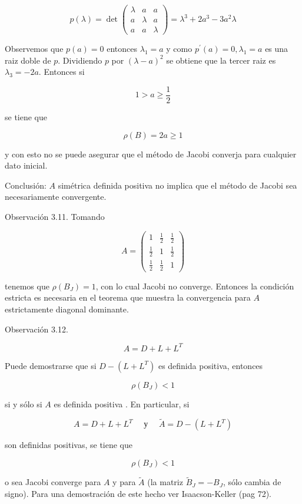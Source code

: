 \documentclass[10pt]{book}
\begin{document}
$$
p(\lambda)=\operatorname{det}\left(\begin{array}{ccc}
\lambda & a & a \\
a & \lambda & a \\
a & a & \lambda
\end{array}\right)=\lambda^{3}+2 a^{3}-3 a^{2} \lambda
$$

Observemos que $p(a)=0$ entonces $\lambda_{1}=a$ y como $p^{\prime}(a)=0, \lambda_{1}=a$ es una raiz doble de $p$. Dividiendo $p$ por $(\lambda-a)^{2}$ se obtiene que la tercer raiz es $\lambda_{3}=-2 a$. Entonces si

$$
1>a \geq \frac{1}{2}
$$

se tiene que

$$
\rho(B)=2 a \geq 1
$$

y con esto no se puede asegurar que el método de Jacobi converja para cualquier dato inicial.

Conclusión: $A$ simétrica definida positiva no implica que el método de Jacobi sea necesariamente convergente.

Observación 3.11. Tomando

$$
A=\left(\begin{array}{ccc}
1 & \frac{1}{2} & \frac{1}{2} \\
\frac{1}{2} & 1 & \frac{1}{2} \\
\frac{1}{2} & \frac{1}{2} & 1
\end{array}\right)
$$

tenemos que $\rho\left(B_{J}\right)=1$, con lo cual Jacobi no converge. Entonces la condición estricta es necesaria en el teorema que muestra la convergencia para $A$ estrictamente diagonal dominante.

Observación 3.12.

$$
A=D+L+L^{T}
$$

Puede demostrarse que si $D-\left(L+L^{T}\right)$ es definida positiva, entonces

$$
\rho\left(B_{J}\right)<1
$$

si y sólo si $A$ es definida positiva . En particular, si

$$
A=D+L+L^{T} \quad \text { у } \quad \tilde{A}=D-\left(L+L^{T}\right)
$$

son definidas positivas, se tiene que

$$
\rho\left(B_{J}\right)<1
$$

o sea Jacobi converge para $A$ y para $\tilde{A}$ (la matriz $\tilde{B}_{J}=-B_{J}$, sólo cambia de signo). Para una demostración de este hecho ver Isaacson-Keller (pag 72).
\end{document}
